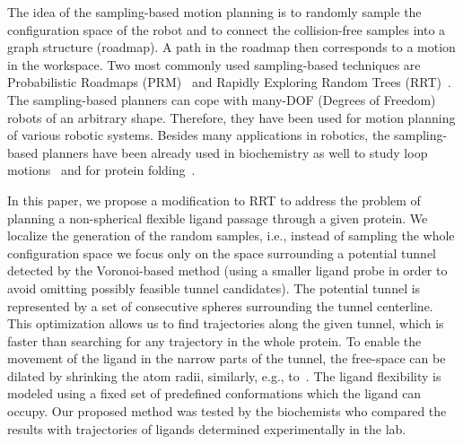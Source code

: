 \documentclass[usletter, 10pt, conference]{ieeeconf} %
\begin{document}
The idea of the sampling-based motion planning is to randomly sample the configuration space of the robot and to connect the collision-free samples
into a graph structure (roadmap).
A path in the roadmap then corresponds to a motion in the workspace.
Two most commonly used sampling-based techniques are Probabilistic Roadmaps (PRM)~\cite{kavrakiForPP} and Rapidly Exploring Random Trees (RRT)~\cite{lavalleRRT}.
The sampling-based planners can cope with many-DOF (Degrees of Freedom) robots of an arbitrary shape.
Therefore, they have been used for motion planning of various robotic systems.
Besides many applications in robotics, the sampling-based planners have been already used in biochemistry as well 
to study loop motions~\cite{cortes2004geometric}
and for protein folding~\cite{raveh2009rapid,novinskaya2015improving}.

In this paper, we propose a modification to RRT to address the problem of planning a non-spherical flexible ligand passage through a given protein.
We localize the generation of the random samples, i.e., instead of sampling the whole configuration space we focus only on the space surrounding a potential tunnel detected by the Voronoi-based method (using a smaller ligand probe in order to avoid omitting possibly feasible tunnel candidates).
The potential tunnel is represented by a set of consecutive spheres surrounding the tunnel centerline.
This optimization allows us to find trajectories along the given tunnel, which is faster than searching for any trajectory in the whole protein.
To enable the movement of the ligand in the narrow parts of the tunnel, the free-space can be dilated by shrinking the atom radii, similarly, e.g., to~\cite{cortes2005path,hsu06multilevel}. 
The ligand flexibility is modeled using a fixed set of predefined conformations which the ligand can occupy.
Our proposed method was tested by the biochemists who compared the results with trajectories of ligands determined experimentally in the lab.
\end{document}
